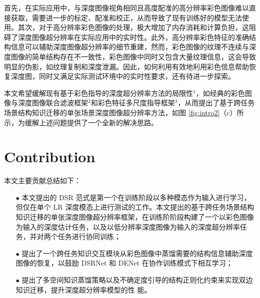 \documentclass{vip-theme}
\begin{document}
\begin{sloppypar}
首先，在实际应用中，与深度图像视角相同且高度配准的高分辨率彩色图像难以直接获取，需要进一步的标定、配准和校正，从而导致了现有训练好的模型无法使用。其次，对于高分辨率彩色图像的处理，极大增加了内存消耗和计算负担，这阻碍了深度图像超分辨率在实际应用中的实时性。此外，高分辨率彩色特征的准确结构信息可以辅助深度图像超分辨率的细节重建，然而，彩色图像的纹理不连续与深度图像的简单结构存在不一致性，彩色图像中同时又包含大量纹理信息，这会导致明显的伪影，如纹理复制和深度泄漏。因此，如何利用有效地利用彩色信息帮助恢复深度图，同时又满足实际测试环境中的实时性要求，还有待进一步探索。

本文希望缓解现有基于彩色指导的深度超分辨率方法的局限性$^1$，如经典的彩色图像与深度图像联合滤波框架$^2$和彩色特征多尺度指导框架$^3$，从而提出了基于跨任务场景结构知识迁移的单张场景深度图像超分辨率方法，如图 \ref{fig:intro2}（c）所示，为缓解上述问题提供了一个全新的解决思路。




\section{Contribution}
\label{contribution}
本文主要贡献总结如下：
\begin{itemize}
	\item[$\bullet$] 本文提出的 DSR 范式是第一个在训练阶段以多种模态作为输入进行学习，但仅在单个 LR 深度模态上进行测试的工作。本文提出的基于跨任务场景结构知识迁移的单张深度图像超分辨率框架，在训练阶阶段构建了一个以彩色图像为输入的深度估计任务，以及以低分辨率深度图像为输入的深度超分辨率任务，并对两个任务进行协同训练；

	\item[$\bullet$] 提出了一个跨任务知识交互模块从彩色图像中蒸馏需要的结构信息辅助深度图像的恢复，以鼓励 DSRNet 和 DENet 在协作训练模式下相互学习；

	\item[$\bullet$] 提出了多空间知识蒸馏策略以及不确定度引导的结构正则化约束来实现双边知识迁移，提升深度超分辨率模型的性
能。


\end{itemize}
\end{sloppypar}
\end{document}
